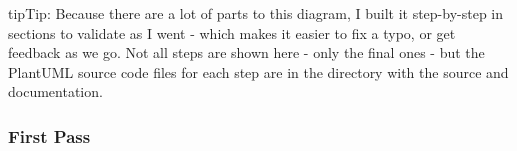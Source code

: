 \documentclass[letterpaper,10pt,english]{sphinxmanual}
\begin{document}
\begin{sphinxadmonition}{tip}{Tip:}
Because there are a lot of parts to this diagram, I built it step-by-step in sections to validate as I went - which makes it easier to fix a typo, or get feedback as we go.
Not all steps are shown here - only the final ones - but the PlantUML source code files for each step are in the directory with the source and documentation.
\end{sphinxadmonition}


\subsubsection{First Pass}
\label{\detokenize{aws/aws:first-pass}}
\begin{figure}[htbp]
\centering

\end{figure}
\end{document}
